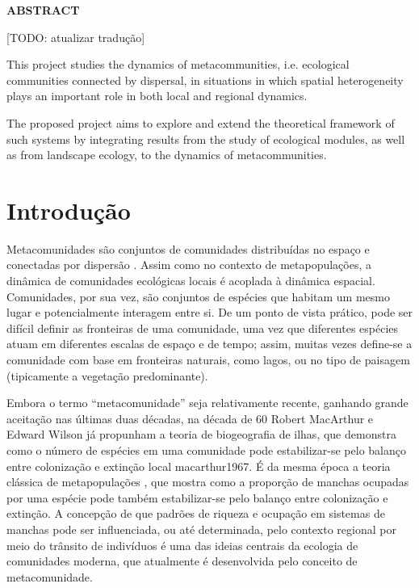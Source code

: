 \documentclass[12pt]{extarticle}
\begin{document}
\newpage

\setlength{\parindent}{20pt}
\thispagestyle{empty}
\begin{center}
    \bf \Large \color{blue} ABSTRACT
\end{center}
\vskip 3.0cm
{\it

    [TODO: atualizar tradução]

    This project studies the dynamics of metacommunities, i.e.
    ecological communities connected by dispersal, in situations in which
    spatial heterogeneity plays an important role in both local and regional
    dynamics.

    The proposed project aims to explore and extend the theoretical framework
    of such systems by integrating results from the study of ecological modules,
    as well as from landscape ecology, to the dynamics of metacommunities.
}

\newpage
\setcounter{page}{1}
\onehalfspacing

\section{Introdução}

Metacomunidades são conjuntos de comunidades distribuídas no espaço e
conectadas por dispersão \citep{hanski1991, holyoak2005}. Assim como no
contexto de metapopulações, a dinâmica de comunidades ecológicas locais é
acoplada à dinâmica espacial.  Comunidades, por sua vez, são conjuntos de
espécies que habitam um mesmo lugar e potencialmente interagem entre si. De um
ponto de vista prático, pode ser difícil definir as fronteiras de uma
comunidade, uma vez que diferentes espécies atuam em diferentes escalas de
espaço e de tempo; assim, muitas vezes define-se a comunidade com base em
fronteiras naturais, como lagos, ou no tipo de paisagem (tipicamente a
vegetação predominante).

Embora o termo ``metacomunidade'' seja relativamente recente, ganhando grande
aceitação nas últimas duas décadas, na década de 60 Robert MacArthur e Edward Wilson
já propunham a
teoria de biogeografia de ilhas, que demonstra como o número de espécies em uma comunidade pode estabilizar-se
pelo balanço entre colonização e extinção local {macarthur1967}. 
É da mesma época a teoria clássica de metapopulações \citep{levins1969,levins1971}, 
que mostra como a proporção de manchas ocupadas por uma espécie pode também estabilizar-se pelo 
balanço entre colonização e extinção.
A concepção de que padrões de riqueza e ocupação em sistemas de manchas pode ser influenciada, ou até
determinada, pelo contexto regional por meio do trânsito de indivíduos 
é uma das ideias centrais da ecologia de
comunidades moderna, que atualmente é desenvolvida pelo conceito de
metacomunidade.
\end{document}
